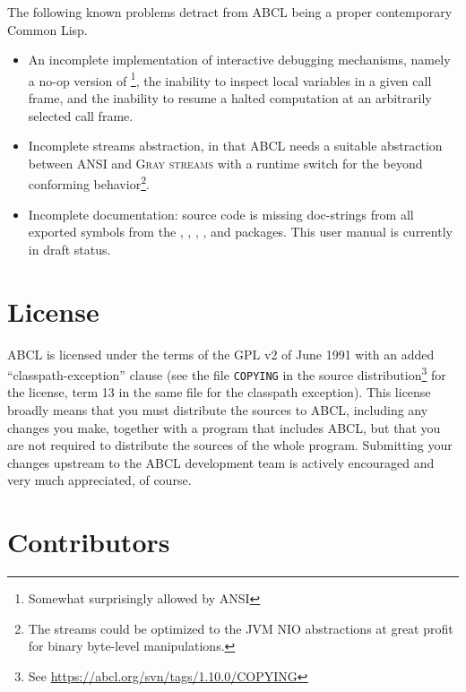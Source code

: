 \documentclass[10pt]{book}
\begin{document}
The following known problems detract from \textsc{ABCL} being a proper
contemporary Common Lisp.
\begin{itemize}
\item An incomplete implementation of interactive debugging
  mechanisms, namely a no-op version of \footnote{Somewhat
    surprisingly allowed by \textsc{ANSI}}, the inability to inspect
  local variables in a given call frame, and the inability to resume a
  halted computation at an arbitrarily selected call frame.
\item Incomplete streams abstraction, in that \textsc{ABCL} needs a
  suitable abstraction between \textsc{ANSI} and \textsc{Gray streams}
  with a runtime switch for the beyond conforming
  behavior\footnote{The streams could be optimized to the
    \textsc{JVM} NIO \cite{nio} abstractions at great profit for
    binary byte-level manipulations.}.
\item Incomplete documentation: source code is missing doc-strings from
  all exported symbols from the , ,
  , , and  packages.  This user
  manual is currently in draft status.
\end{itemize}



\section{License}

\textsc{ABCL} is licensed under the terms of the \textsc{GPL} v2 of
June 1991 with an added ``classpath-exception'' clause (see the file
\texttt{COPYING} in the source distribution\footnote{See
  \url{https://abcl.org/svn/tags/1.10.0/COPYING}} for the license,
term 13 in the same file for the classpath exception).  This license
broadly means that you must distribute the sources to \textsc{ABCL},
including any changes you make, together with a program that includes
\textsc{ABCL}, but that you are not required to distribute the sources
of the whole program.  Submitting your changes upstream to the \textsc{ABCL}
development team is actively encouraged and very much appreciated, of
course.

\section{Contributors}
\end{document}
